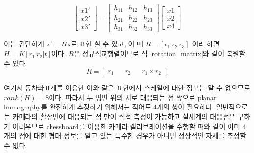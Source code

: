 \documentclass[master,korean,final]{cbnu-ecs}
\begin{document}
\begin{equation}
\begin{bmatrix} x1'\\x2'\\x3' \end{bmatrix} = \begin{bmatrix} h_{11} & h_{12} & h_{13} \\ h_{21} & h_{22} & h_{23} \\ h_{31} & h_{32} & h_{33} \end{bmatrix}\begin{bmatrix} x1\\x2\\x4 \end{bmatrix} \label{planar_homography}
\end{equation}

이는 간단하게 $\mathrm{x}'=H\mathrm{x}$로 표현 할 수 있고, 이 때 $R=[r_1 \ r_2 \ r_3]$ 이라 하면 $H=K[r_{1} \  r_{2}|t]$이다.
$R$은 정규직교행렬이므로 식 \eqref{rotation_matrix}와 같이 복원할 수 있다.
\begin{equation}
R=\begin{bmatrix}r_1 && r_2 && r_1\times r_2\end{bmatrix} 
\label{rotation_matrix}
\end{equation}

여기서 동차좌표계를 이용한 이와 같은 표현에서 스케일에 대한 정보는 알 수 없으므로 $rank(H)=8$이다. 따라서 두 평면 위의 서로 대응되는 점 쌍으로 planar homography를 완전하게 추정하기 위해서는 적어도 4개의 쌍이 필요하다. 일반적으로는 카메라의 촬상면에 대응되는 점 만이 직접 측정이 가능하고 실세계의 대응점은 구하기 어려우므로 chessboard를 이용한 카메라 캘리브레이션을 수행할 때와 같이 이미 4개의 점에 대한 형태 정보를 알고 있는 특수한 경우가 아니면 정상적인 자세를 추정할 수 없다.
\end{document}

